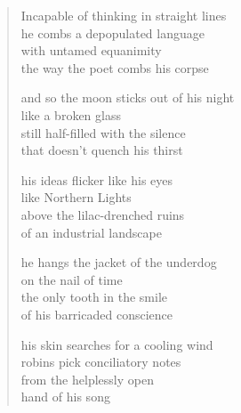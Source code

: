 \begin{verse}

Incapable of thinking in straight lines\\
he combs a depopulated language\\
with untamed equanimity\\
the way the poet combs his corpse

and so the moon sticks out of his night\\
like a broken glass\\
still half-filled with the silence\\
that doesn't quench his thirst

his ideas flicker like his eyes\\
like Northern Lights\\
above the lilac-drenched ruins\\
of an industrial landscape

he hangs the jacket of the underdog\\
on the nail of time\\
the only tooth in the smile\\
of his barricaded conscience

\clearpage

his skin searches for a cooling wind\\
robins pick conciliatory notes\\
from the helplessly open\\
hand of his song

\end{verse}
